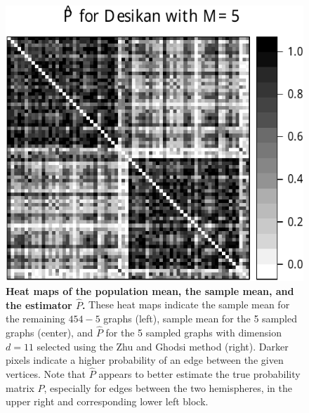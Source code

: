 \documentclass[10pt,letterpaper]{article}
\renewcommand{\hat}{\widehat}
\begin{document}
\begin{figure}[!htb]
\includegraphics[height=.186\textheight]{Phat_desikan_m5.pdf}
\caption{{\bf Heat maps of the population mean, the sample mean, and the estimator $\hat{P}$.}
These heat maps indicate the sample mean for the remaining $454-5$ graphs (left), sample mean for the 5 sampled graphs (center), and $\hat{P}$ for the 5 sampled graphs with dimension $d=11$ selected using the Zhu and Ghodsi method (right).
Darker pixels indicate a higher probability of an edge between the given vertices.
Note that $\hat{P}$ appears to better estimate the true probability matrix $P$, especially for edges between the two hemispheres, in the upper right and corresponding lower left block.
}
\label{fig:Matrix_desikan_m5}
\end{figure}
\end{document}
